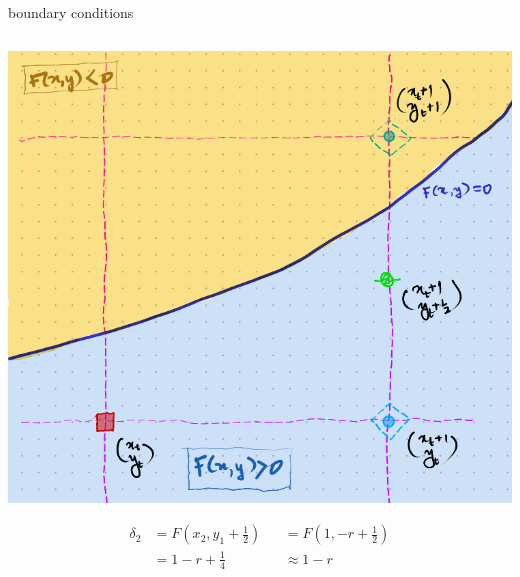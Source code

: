 \documentclass[aspectratio=169,xcolor={dvipsnames,svgnames}]{beamer}
\begin{document}
\begin{frame}[label={sec:orgf1ab005}]{boundary conditions}
\begin{columns}
\begin{column}{.35\columnwidth}
\begin{center}
\includegraphics[width=.9\linewidth]{org-download-images/mid-point_algorithm/2024-09-03_22-08-34_screenshot.png}
\end{center}
\begin{align*}
  \delta_2 &= F(x_{2},y_{1}+\frac12) &&= F(1,-r+\frac12) \\
           &= 1-r+\frac14 &&\approx 1-r
\end{align*}
\end{column}
\end{columns}
\end{frame}


\end{document}
